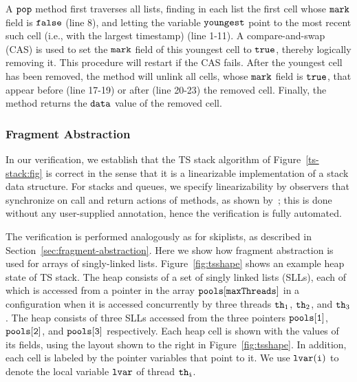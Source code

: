A ${\tt pop}$ method first traverses all lists, finding in each list
the first cell whose ${\tt mark}$ field is ${\tt false}$ (line 8),
and letting the variable ${\tt youngest}$ point to the most recent such cell
(i.e., with the largest timestamp) (line 1-11).
A compare-and-swap (CAS) is used
to set the ${\tt mark}$ field of this youngest cell to ${\tt true}$,
thereby logically removing it.
This procedure will restart if the CAS fails. After the youngest cell has been removed, the method will unlink all cells, whose ${\tt mark}$ field is ${\tt true}$,
that appear before (line 17-19) or after (line 20-23) the removed cell.
Finally, the method returns the ${\tt data}$ value of the removed cell.

\subsubsection{Fragment Abstraction}
In our verification, we establish that the TS stack algorithm of
Figure~\ref{ts-stack:fig} is correct in the sense that it is a
linearizable implementation of a stack data structure.
For stacks and queues, we specify linearizability by 
 observers that synchronize on call and return actions of
  methods, as shown by~\cite{BEEH:icalp15}; this is done without
 any user-supplied annotation, hence the verification is fully automated.

 The verification is performed analogously as for skiplists, as described
 in Section~\ref{sec:fragment-abstraction}. Here we show how fragment
 abstraction is used for arrays of singly-linked lists.
Figure~\ref{fig:tsshape} shows an  example heap state of TS stack.
The heap consists of a set of singly linked lists (SLLs), each of which
is accessed from a pointer in the array ${\tt pools[maxThreads]}$
in a configuration when %
it is accessed concurrently by three threads ${\tt th}_1$, ${\tt th}_2$, and ${\tt th}_3$. The heap consists of three SLLs accessed from the three pointers $\tt pools[1]$, $\tt pools[2]$, and $\tt pools[3]$ respectively. Each heap cell is
shown with the values of its fields, using the layout shown to the right in
Figure~\ref{fig:tsshape}.
In addition, each cell is labeled by the pointer variables that point to it.
We use ${\tt lvar(i)}$ to denote the local
variable ${\tt lvar}$ of thread ${\tt th}_{\tt i}$.

